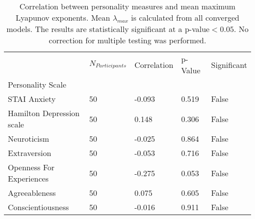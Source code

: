 \begin{table}
\centering
\caption{Correlation between personality measures and mean maximum Lyapunov exponents. Mean $\lambda_{max}$                                                                                   is calculated from all converged models. The results are statistically significant at a p-value$<0.05$.                                                                                   No correction for multiple testing was performed.}
\label{tab:mean_le_personality_cor_table}
\begin{tabular}{lllll}
\toprule
 & $N_{Participants}$ & Correlation & p-Value & Significant \\
Personality Scale &  &  &  &  \\
\midrule
STAI Anxiety & 50 & -0.093 & 0.519 & False \\
Hamilton Depression scale & 50 & 0.148 & 0.306 & False \\
Neuroticism & 50 & -0.025 & 0.864 & False \\
Extraversion & 50 & -0.053 & 0.716 & False \\
Openness For Experiences & 50 & -0.275 & 0.053 & False \\
Agreeableness & 50 & 0.075 & 0.605 & False \\
Conscientiousness & 50 & -0.016 & 0.911 & False \\
\bottomrule
\end{tabular}
\end{table}
